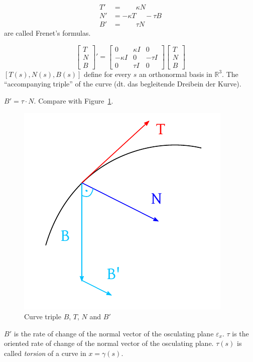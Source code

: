\documentclass{article}
\begin{document}
\begin{mdframed}
  \begin{align*}
    T' &= \phantom{-\kappa T} \kappa N \\
    N' &= -\kappa T \phantom{\tau N} - \tau B \\
    B' &= \phantom{-\kappa T} \tau N
  \end{align*}
  are called Frenet's formulas.

  \[ \begin{bmatrix} T \\ N \\ B \end{bmatrix}' = \begin{bmatrix} 0 & \kappa I & 0 \\ -\kappa I & 0 & -\tau I \\ 0 & \tau I & 0 \end{bmatrix} \begin{bmatrix} T \\ N \\ B \end{bmatrix} \]
  $[T(s), N(s), B(s)]$ define for every $s$ an orthonormal basis in $\mathbb R^3$.
  The \enquote{accompanying triple} of the curve (dt. \foreignlanguage{german}{das begleitende Dreibein der Kurve}).
\end{mdframed}

$B' = \tau \cdot N$. Compare with Figure~\ref{img:ntb}.
\begin{figure}[t]
  \begin{center}
    \includegraphics{img/54_curve_triple.pdf}
    \caption{Curve triple $B$, $T$, $N$ and $B'$}
    \label{img:ntb}
  \end{center}
\end{figure}
$B'$ is the rate of change of the normal vector of the osculating plane $\varepsilon_x$.
$\tau$ is the oriented rate of change of the normal vector of the osculating plane.
$\tau(s)$ is called \emph{torsion} of a curve in $x = \gamma(s)$.
\end{document}
